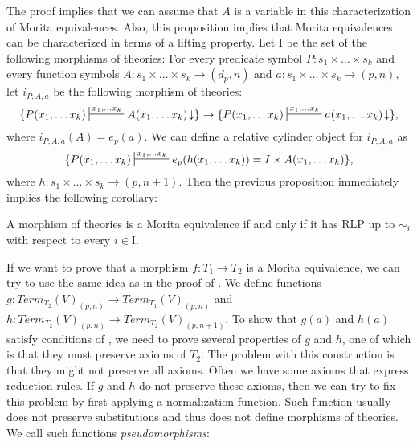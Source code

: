 \documentclass[reqno]{amsart}
\theoremstyle{definition}
\theoremstyle{remark}
\newcommand{\I}{\mathrm{I}}
\numberwithin{figure}{section}
\begin{document}
The proof implies that we can assume that $A$ is a variable in this characterization of Morita equivalences.
Also, this proposition implies that Morita equivalences can be characterized in terms of a lifting property.
Let $\I$ be the set of the following morphisms of theories:
For every predicate symbol $P : s_1 \times \ldots \times s_k$ and every function symbols $A : s_1 \times \ldots \times s_k \to (d_p,n)$ and $a : s_1 \times \ldots \times s_k \to (p,n)$,
let $i_{P,A,a}$ be the following morphism of theories:
\[ \{ P(x_1, \ldots x_k) \sststile{}{x_1, \ldots x_k} A(x_1, \ldots x_k)\!\downarrow \} \to \{ P(x_1, \ldots x_k) \sststile{}{x_1, \ldots x_k} a(x_1, \ldots x_k)\!\downarrow \}, \]
where $i_{P,A,a}(A) = e_p(a)$.
We can define a relative cylinder object for $i_{P,A,a}$ as
\[ \{ P(x_1, \ldots x_k) \sststile{}{x_1, \ldots x_k} e_p(h(x_1, \ldots x_k)) = I \times A(x_1, \ldots x_k) \}, \]
where $h : s_1 \times \ldots \times s_k \to (p,n+1)$.
Then the previous proposition immediately implies the following corollary:

\begin{cor}
A morphism of theories is a Morita equivalence if and only if it has RLP up to $\sim_i$ with respect to every $i \in \I$.
\end{cor}

If we want to prove that a morphism $f : T_1 \to T_2$ is a Morita equivalence, we can try to use the same idea as in the proof of \cite[Lemma~3.7]{alg-models}.
We define functions $g : Term_{T_2}(V)_{(p,n)} \to Term_{T_1}(V)_{(p,n)}$ and $h : Term_{T_2}(V)_{(p,n)} \to Term_{T_2}(V)_{(p,n+1)}$.
To show that $g(a)$ and $h(a)$ satisfy conditions of , we need to prove several properties of $g$ and $h$,
one of which is that they must preserve axioms of $T_2$.
The problem with this construction is that they might not preserve all axioms.
Often we have some axioms that express reduction rules.
If $g$ and $h$ do not preserve these axioms, then we can try to fix this problem by first applying a normalization function.
Such function usually does not preserve substitutions and thus does not define morphisms of theories.
We call such functions \emph{pseudomorphisms}:
\end{document}
